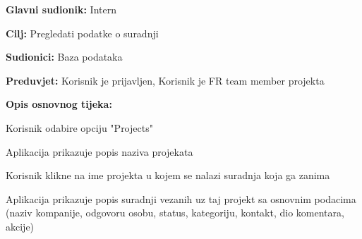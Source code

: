 					\noindent {}
					\begin{packed_item}
					
						\item \textbf{Glavni sudionik:} Intern
						\item \textbf{Cilj:} Pregledati podatke o suradnji
						\item \textbf{Sudionici:} Baza podataka
						\item \textbf{Preduvjet:} Korisnik je prijavljen, Korisnik je FR team member projekta
						\item \textbf{Opis osnovnog tijeka:}

						\item[] \begin{packed_enum}

							\item Korisnik odabire opciju "Projects"
							\item Aplikacija prikazuje popis naziva projekata
							\item Korisnik klikne na ime projekta u kojem se nalazi suradnja koja ga zanima
							\item Aplikacija prikazuje popis suradnji vezanih uz taj projekt sa osnovnim podacima (naziv kompanije, odgovoru osobu, status, kategoriju, kontakt, dio komentara, akcije)
						\end{packed_enum}
	
					\end{packed_item}

